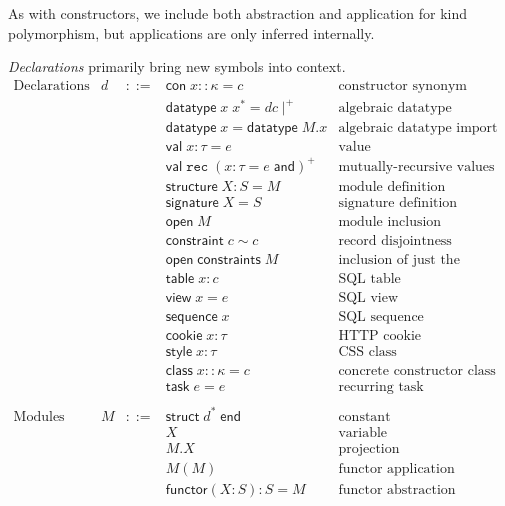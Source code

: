 \documentclass{article}
\newcommand{\cd}[1]{\texttt{#1}}
\newcommand{\mt}[1]{\mathsf{#1}}
\begin{document}
As with constructors, we include both abstraction and application for kind polymorphism, but applications are only inferred internally.

\emph{Declarations} primarily bring new symbols into context.
$$\begin{array}{rrcll}
  \textrm{Declarations} & d &::=& \mt{con} \; x :: \kappa = c & \textrm{constructor synonym} \\
  &&& \mt{datatype} \; x \; x^* = dc\mid^+ & \textrm{algebraic datatype definition} \\
  &&& \mt{datatype} \; x = \mt{datatype} \; M.x & \textrm{algebraic datatype import} \\
  &&& \mt{val} \; x : \tau = e & \textrm{value} \\
  &&& \mt{val} \; \cd{rec} \; (x : \tau = e \; \mt{and})^+ & \textrm{mutually-recursive values} \\
  &&& \mt{structure} \; X : S = M & \textrm{module definition} \\
  &&& \mt{signature} \; X = S & \textrm{signature definition} \\
  &&& \mt{open} \; M & \textrm{module inclusion} \\
  &&& \mt{constraint} \; c \sim c & \textrm{record disjointness constraint} \\
  &&& \mt{open} \; \mt{constraints} \; M & \textrm{inclusion of just the constraints from a module} \\
  &&& \mt{table} \; x : c & \textrm{SQL table} \\
  &&& \mt{view} \; x = e & \textrm{SQL view} \\
  &&& \mt{sequence} \; x & \textrm{SQL sequence} \\
  &&& \mt{cookie} \; x : \tau & \textrm{HTTP cookie} \\
  &&& \mt{style} \; x : \tau & \textrm{CSS class} \\
  &&& \mt{class} \; x :: \kappa = c & \textrm{concrete constructor class} \\
  &&& \mt{task} \; e = e & \textrm{recurring task} \\
  \\
  \textrm{Modules} & M &::=& \mt{struct} \; d^* \; \mt{end} & \textrm{constant} \\
  &&& X & \textrm{variable} \\
  &&& M.X & \textrm{projection} \\
  &&& M(M) & \textrm{functor application} \\
  &&& \mt{functor}(X : S) : S = M & \textrm{functor abstraction} \\
\end{array}$$
\end{document}
